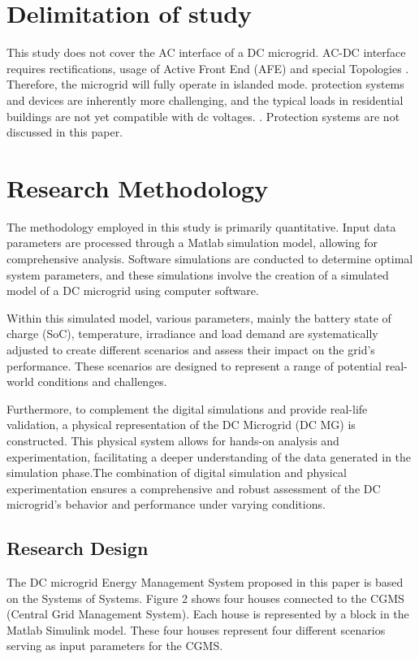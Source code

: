 \section{Delimitation of study}
This study does not cover the AC interface of a DC microgrid. AC-DC interface requires rectifications, usage of Active Front End (AFE) and special Topologies \cite{4}. Therefore, the microgrid will fully operate in islanded mode. protection systems and devices are inherently more challenging, and the typical loads in residential buildings are not yet compatible with dc voltages. \cite{5}. Protection systems are not discussed in this paper.

\section{Research Methodology}
The methodology employed in this study is primarily quantitative. Input data parameters are processed through a Matlab simulation model, allowing for comprehensive analysis. Software simulations are conducted to determine optimal system parameters, and these simulations involve the creation of a simulated model of a DC microgrid using computer software.\par
Within this simulated model, various parameters, mainly the battery state of charge (SoC), temperature, irradiance and load demand are systematically adjusted to create different scenarios and assess their impact on the grid's performance. These scenarios are designed to represent a range of potential real-world conditions and challenges.\par
Furthermore, to complement the digital simulations and provide real-life validation, a physical representation of the DC Microgrid (DC MG) is constructed. This physical system allows for hands-on analysis and experimentation, facilitating a deeper understanding of the data generated in the simulation phase.The combination of digital simulation and physical experimentation ensures a comprehensive and robust assessment of the DC microgrid's behavior and performance under varying conditions.

\subsection{Research Design}
The DC microgrid Energy Management System proposed in this paper is based on the Systems of Systems. Figure 2 shows four houses connected to the CGMS (Central Grid Management System). Each house is represented by a block in the Matlab Simulink model. These four houses represent four different scenarios serving as input parameters for the CGMS.

